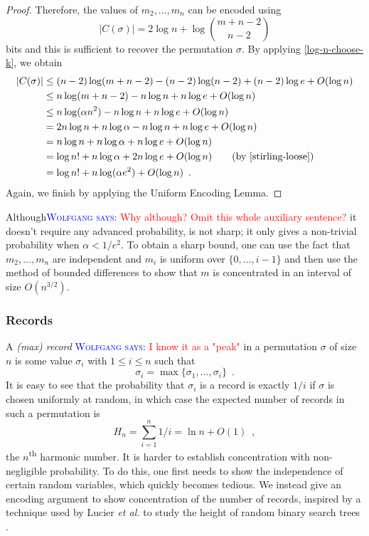 \documentclass{patmorin}
\newcommand{\aremark}[3]{\textcolor{blue}{\textsc{#1 #2:}}
  \textcolor{red}{\textsf{#3}}}
\newcommand{\wolfgang}[2][says]{\aremark{Wolfgang}{#1}{#2}}
\begin{document}
\begin{proof}
  Therefore, the values of $m_2,\ldots,m_n$ can be encoded using
  \[
    |C(\sigma)| = 2\log n + \log\binom{m+n-2}{n-2}
  \]
  bits and this is sufficient to recover the permutation $\sigma$.  By
  applying \eqref{log-n-choose-k}, we obtain
  \begin{align*}
    |C(\sigma)| & \le (n-2)\log(m+n-2) - (n-2)\log(n-2)  + (n-2)\log e + O(\log n) \\
      & \le n\log(m+n-2) - n\log n   + n\log e + O(\log n) \\
      & \le n\log(\alpha n^2) - n\log n  + n\log e + O(\log n) \\
      & = 2n\log n + n\log\alpha - n\log n  + n\log e + O(\log n) \\
      & = n\log n + n\log\alpha + n\log e + O(\log n) \\
      & = \log n! + n\log\alpha + 2n\log e + O(\log n) \tag{by \eqref{stirling-loose}} \\
      & = \log n! + n \log (\alpha e^2) + O(\log n) \enspace .
  \end{align*}
  Again, we finish by applying the Uniform Encoding Lemma.
\end{proof}


\begin{rem}
  Although\wolfgang{Why although? Omit this whole auxiliary sentence?} it doesn't require any advanced probability,
   is not sharp; it only gives a non-trivial
  probability when $\alpha < 1/e^2$.  To obtain a sharp bound, one can
  use the fact that $m_2,\ldots,m_n$ are independent and $m_i$ is
  uniform over $\{0,\ldots,i-1\}$ and then use the method of bounded
  differences \cite{mcdiarmid:on} to show that $m$ is concentrated in
  an interval of size $O(n^{3/2})$.
\end{rem}

\subsubsection{Records}

A \emph{(max) record}
\wolfgang{I know it as a "peak"} 
in a permutation $\sigma$ of size $n$ is some
value $\sigma_i$ with $1 \leq i \leq n$ such that
\[
  \sigma_i = \max\{\sigma_1, \dots, \sigma_i\} \enspace .
\]
It is easy to see that the probability that $\sigma_i$ is a record is
exactly $1/i$ if $\sigma$ is chosen uniformly at random, in which case
the expected number of records in such a permutation is
\[
  H_n = \sum_{i = 1}^n 1/i = \ln n + O(1) \enspace ,
\]
the $n$\textsuperscript{th} harmonic number. It is harder to establish
concentration with non-negligible probability. To do this, one first
needs to show the independence of certain random variables, which
quickly becomes tedious. We instead give an encoding argument to show
concentration of the number of records, inspired by a technique used
by Lucier \emph{et al.} to study the height of random binary search
trees \cite{lucier.jiang.li:quicksort}.
\end{document}
